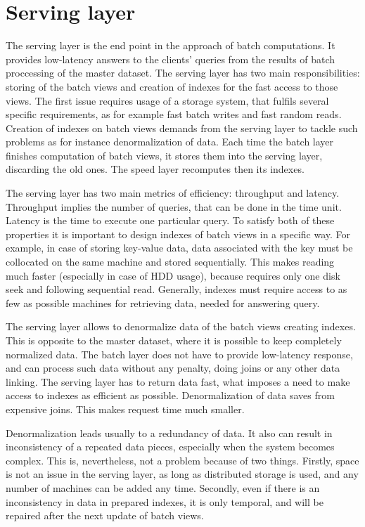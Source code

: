 \section{Serving layer}

The serving layer is the end point in the approach of batch computations.
It provides low-latency answers to the clients' queries from the results of batch proccessing of the master dataset.
The serving layer has two main responsibilities: storing of the batch views and creation of indexes for the fast access to those views.
The first issue requires usage of a storage system, that fulfils several specific requirements, as for example fast batch writes and fast random reads. 
Creation of indexes on batch views demands from the serving layer to tackle such problems as for instance denormalization of data.
Each time the batch layer finishes computation of batch views, it stores them into the serving layer, discarding the old ones.
The speed layer recomputes then its indexes.

The serving layer has two main metrics of efficiency: throughput and latency.
Throughput implies the number of queries, that can be done in the time unit.
Latency is the time to execute one particular query.
To satisfy both of these properties it is important to design indexes of batch views in a specific way.
For example, in case of storing key-value data, data associated with the key must be collocated on the same machine and stored sequentially.
This makes reading much faster (especially in case of HDD usage), because requires only one disk seek and following sequential read.
Generally, indexes must require access to as few as possible machines for retrieving data, needed for answering query.

The serving layer allows to denormalize data of the batch views creating indexes.
This is opposite to the master dataset, where it is possible to keep completely normalized data.
The batch layer does not have to provide low-latency response, and can process such data without any penalty, doing joins or any other data linking.
The serving layer has to return data fast, what imposes a need to make access to indexes as efficient as possible.
Denormalization of data saves from expensive joins.
This makes request time much smaller.

Denormalization leads usually to a redundancy of data.
It also can result in inconsistency of a repeated data pieces, especially when the system becomes complex.
This is, nevertheless, not a problem because of two things.
Firstly, space is not an issue in the serving layer, as long as distributed storage is used, and any number of machines can be added any time.
Secondly, even if there is an inconsistency in data in prepared indexes, it is only temporal, and will be repaired after the next update of batch views.

